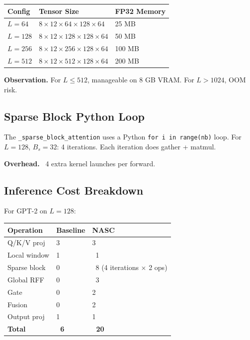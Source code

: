 \begin{table}[H]
\centering
\small
\begin{tabular}{lll}
\toprule
\textbf{Config} & \textbf{Tensor Size} & \textbf{FP32 Memory} \\
\midrule
$L=64$ & $8 \times 12 \times 64 \times 128 \times 64$ & 25 MB \\
$L=128$ & $8 \times 12 \times 128 \times 128 \times 64$ & 50 MB \\
$L=256$ & $8 \times 12 \times 256 \times 128 \times 64$ & 100 MB \\
$L=512$ & $8 \times 12 \times 512 \times 128 \times 64$ & 200 MB \\
\bottomrule
\end{tabular}
\end{table}

\textbf{Observation.} For $L \le 512$, manageable on 8 GB VRAM. For $L > 1024$, 
OOM risk.

\subsection{Sparse Block Python Loop}

The \texttt{\_sparse\_block\_attention} uses a Python \texttt{for i in range(nb)} loop. For 
$L = 128$, $B_s = 32$: 4 iterations. Each iteration does gather + matmul.

\textbf{Overhead.} ~4 extra kernel launches per forward.

\subsection{Inference Cost Breakdown}

For GPT-2 on $L = 128$:

\begin{table}[H]
\centering
\small
\begin{tabular}{lll}
\toprule
\textbf{Operation} & \textbf{Baseline} & \textbf{NASC} \\
\midrule
Q/K/V proj & 3 & 3 \\
Local window & 1 & ~1 \\
Sparse block & 0 & ~8 (4 iterations $\times$ 2 ops) \\
Global RFF & 0 & ~3 \\
Gate & 0 & 2 \\
Fusion & 0 & 2 \\
Output proj & 1 & 1 \\
\textbf{Total} & \textbf{~6} & \textbf{~20} \\
\bottomrule
\end{tabular}
\end{table}

